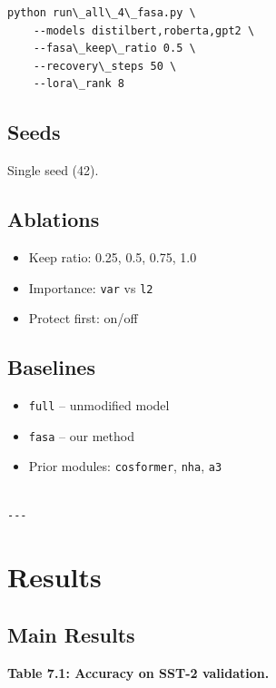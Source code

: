 \begin{lstlisting}
python run\_all\_4\_fasa.py \
    --models distilbert,roberta,gpt2 \
    --fasa\_keep\_ratio 0.5 \
    --recovery\_steps 50 \
    --lora\_rank 8
\end{lstlisting}

\subsection{Seeds}

Single seed (42).

\subsection{Ablations}

\begin{itemize}
\item Keep ratio: 0.25, 0.5, 0.75, 1.0
\item Importance: \texttt{var} vs \texttt{l2}
\item Protect first: on/off

\end{itemize}
\subsection{Baselines}

\begin{itemize}
\item \texttt{full} -- unmodified model
\item \texttt{fasa} -- our method
\item Prior modules: \texttt{cosformer}, \texttt{nha}, \texttt{a3}
\end{itemize}
\begin{lstlisting}

---
\end{lstlisting}


\section{Results}

\subsection{Main Results}

\textbf{Table 7.1: Accuracy on SST-2 validation.}

